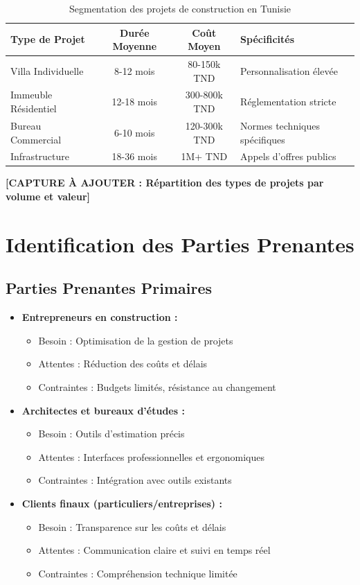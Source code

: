 \begin{table}[h]
\centering
\begin{tabular}{|l|c|c|l|}
\hline
\textbf{Type de Projet} & \textbf{Durée Moyenne} & \textbf{Coût Moyen} & \textbf{Spécificités} \\
\hline
Villa Individuelle & 8-12 mois & 80-150k TND & Personnalisation élevée \\
\hline
Immeuble Résidentiel & 12-18 mois & 300-800k TND & Réglementation stricte \\
\hline
Bureau Commercial & 6-10 mois & 120-300k TND & Normes techniques spécifiques \\
\hline
Infrastructure & 18-36 mois & 1M+ TND & Appels d'offres publics \\
\hline
\end{tabular}
\caption{Segmentation des projets de construction en Tunisie}
\end{table}

\textbf{[CAPTURE À AJOUTER : Répartition des types de projets par volume et valeur]}

\section{Identification des Parties Prenantes}

\subsection{Parties Prenantes Primaires}

\begin{itemize}
    \item \textbf{Entrepreneurs en construction :}
    \begin{itemize}
        \item Besoin : Optimisation de la gestion de projets
        \item Attentes : Réduction des coûts et délais
        \item Contraintes : Budgets limités, résistance au changement
    \end{itemize}
    
    \item \textbf{Architectes et bureaux d'études :}
    \begin{itemize}
        \item Besoin : Outils d'estimation précis
        \item Attentes : Interfaces professionnelles et ergonomiques
        \item Contraintes : Intégration avec outils existants
    \end{itemize}
    
    \item \textbf{Clients finaux (particuliers/entreprises) :}
    \begin{itemize}
        \item Besoin : Transparence sur les coûts et délais
        \item Attentes : Communication claire et suivi en temps réel
        \item Contraintes : Compréhension technique limitée
    \end{itemize}
\end{itemize}

